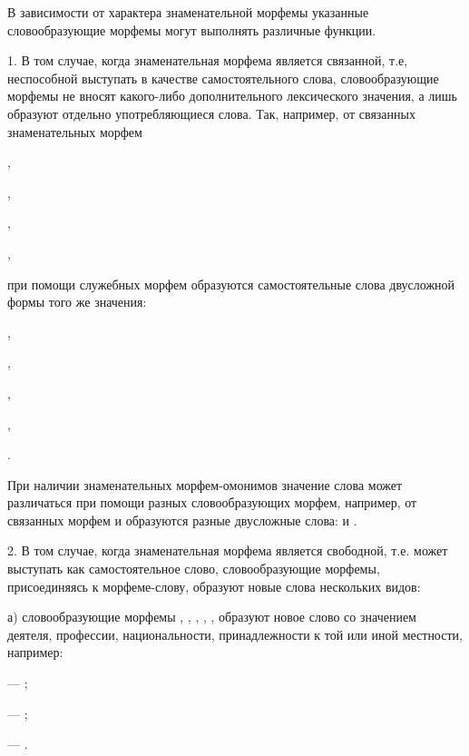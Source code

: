 В зависимости от характера знаменательной морфемы указанные словообразующие морфемы могут выполнять различные функции.

1. В том случае, когда знаменательная морфема является связанной, т.е, неспособной выступать в качестве самостоятельного слова, словообразующие морфемы не
вносят какого-либо дополнительного лексического значения, а лишь образуют отдельно употребляющиеся слова. Так, например, от связанных знаменательных морфем
\begin{prfsample}
    \item {},
    \item {},
    \item {},
    \item {},
    \item {} 
\end{prfsample}
при помощи служебных морфем образуются самостоятельные слова двусложной формы того же значения:
\begin{prfsample}
    \item {},
    \item {},
    \item {},
    \item {},
    \item {}.
\end{prfsample}
При наличии знаменательных морфем-омонимов значение слова может различаться при помощи разных словообразующих морфем, например, от связанных морфем  и  образуются разные двусложные слова:  и .

2. В том случае, когда знаменательная морфема является свободной, т.е. может выступать как самостоятельное слово, словообразующие морфемы, присоединяясь к морфеме-слову, образуют новые слова нескольких видов:

а) словообразующие морфемы , , , , ,  образуют новое слово со значением деятеля, профессии, национальности, принадлежности к той или иной местности, например:
\begin{prfsample}
    \item {} --- ;
    \item {} --- ;
    \item {} --- .    
\end{prfsample}


